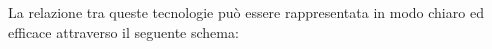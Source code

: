 \documentclass[a4paper,twoside,12pt]{toptesi}
\begin{document}
La relazione tra queste tecnologie può essere rappresentata in modo chiaro ed efficace attraverso il seguente schema:
\begin{center}


\end{center}


\begin{center}

\end{center}
\end{document}
